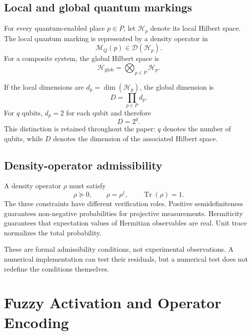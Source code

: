 \documentclass[final,3p,times]{elsarticle}
\newcommand{\Hglob}{\ensuremath{\mathcal{H}_{\mathrm{glob}}}}
\newcommand{\Dens}{\ensuremath{\mathcal{D}}}
\begin{document}
\subsection{Local and global quantum markings}

For every quantum-enabled place $p\in P$, let $\mathcal{H}_p$ denote its local Hilbert space. The local quantum marking is represented by a density operator in
\begin{equation}
    \mathcal{M}_Q(p)\in\Dens(\mathcal{H}_p).
\end{equation}
For a composite system, the global Hilbert space is
\begin{equation}
    \Hglob=\bigotimes_{p\in P}\mathcal{H}_p.
\end{equation}

If the local dimensions are $d_p=\dim(\mathcal{H}_p)$, the global dimension is
\begin{equation}
    D=\prod_{p\in P}d_p.
\end{equation}
For $q$ qubits, $d_p=2$ for each qubit and therefore
\begin{equation}
    D=2^q.
\end{equation}
This distinction is retained throughout the paper: $q$ denotes the number of qubits, while $D$ denotes the dimension of the associated Hilbert space.

\subsection{Density-operator admissibility}

A density operator $\rho$ must satisfy
\begin{equation}
    \rho\succeq0,
    \qquad
    \rho=\rho^\dagger,
    \qquad
    \operatorname{Tr}(\rho)=1.
\end{equation}
The three constraints have different verification roles. Positive semidefiniteness guarantees non-negative probabilities for projective measurements. Hermiticity guarantees that expectation values of Hermitian observables are real. Unit trace normalizes the total probability.

These are formal admissibility conditions, not experimental observations. A numerical implementation can test their residuals, but a numerical test does not redefine the conditions themselves.

\section{Fuzzy Activation and Operator Encoding}
\end{document}
